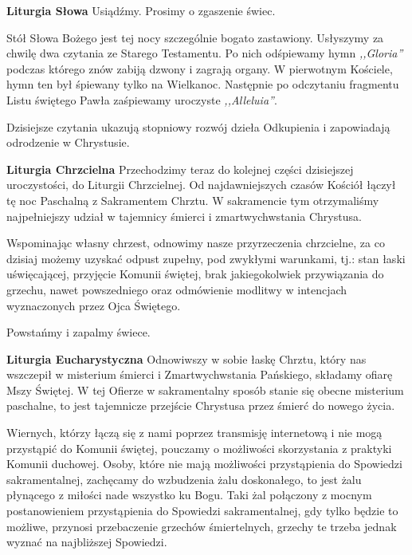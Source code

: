 \documentclass[10pt,oneside,final,notitlepage,a4paper,wide]{mwart}
\begin{document}
	\textbf{Liturgia Słowa} Usiądźmy. Prosimy o zgaszenie świec.
\par Stół Słowa Bożego jest tej nocy szczególnie bogato zastawiony. Usłyszymy za chwilę dwa czytania ze Starego Testamentu. Po nich odśpiewamy hymn \emph{,,Gloria''} podczas którego znów zabiją dzwony i zagrają organy. W pierwotnym Kościele, hymn ten był śpiewany tylko na Wielkanoc. Następnie po odczytaniu fragmentu Listu świętego Pawła zaśpiewamy uroczyste \emph{,,Alleluia''}.
\par Dzisiejsze czytania ukazują stopniowy rozwój dzieła Odkupienia i zapowiadają odrodzenie w Chrystusie. \newpage %

	\textbf{Liturgia Chrzcielna} Przechodzimy teraz do kolejnej części dzisiejszej uroczystości, do Liturgii Chrzcielnej. Od najdawniejszych czasów Kościół łączył tę noc Paschalną z Sakramentem Chrztu. W sakramencie tym otrzymaliśmy najpełniejszy udział w tajemnicy śmierci i zmartwychwstania Chrystusa.
\par Wspominając własny chrzest, odnowimy nasze przyrzeczenia chrzcielne, za co dzisiaj możemy uzyskać odpust zupełny, pod zwykłymi warunkami, tj.: stan łaski uświęcającej, przyjęcie Komunii świętej, brak jakiegokolwiek przywiązania do grzechu, nawet powszedniego oraz odmówienie modlitwy w intencjach wyznaczonych przez Ojca Świętego.
\par Powstańmy i zapalmy świece. \bigskip

	\textbf{Liturgia Eucharystyczna} Odnowiwszy w sobie łaskę Chrztu, który nas wszczepił w misterium śmierci i Zmartwychwstania Pańskiego, składamy ofiarę Mszy Świętej. W tej Ofierze w sakramentalny sposób stanie się obecne misterium paschalne, to jest tajemnicze przejście Chrystusa przez śmierć do nowego życia.
	
	Wiernych, którzy łączą się z nami poprzez transmisję internetową i nie mogą przystąpić do Komunii świętej, pouczamy o możliwości skorzystania z praktyki Komunii duchowej.
	Osoby, które nie mają możliwości przystąpienia do Spowiedzi sakramentalnej, zachęcamy do wzbudzenia żalu doskonałego, to jest żalu płynącego z miłości nade wszystko ku Bogu. Taki żal połączony z mocnym postanowieniem przystąpienia do Spowiedzi sakramentalnej, gdy tylko będzie to możliwe, przynosi przebaczenie grzechów śmiertelnych, grzechy te trzeba jednak wyznać na najbliższej Spowiedzi.
\end{document}
